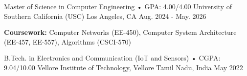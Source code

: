 
\begin{cventries}


\cventry
  {Master of Science in Computer Engineering • GPA: 4.00/4.00}%
  {University of Southern California (USC)}%
  {Los Angeles, CA }%
  {Aug. 2024 - May. 2026}%
  {%
    \begin{cvitems}%
      \item {\textbf{Coursework:} Computer Networks (EE-450), Computer System Architecture (EE-457, EE-557), Algorithms (CSCI-570)}%
    \end{cvitems}%
  }

\cventry
  {B.Tech. in Electronics and Communication (IoT and Sensors) • CGPA: 9.04/10.00}%
  {Vellore Institute of Technology, Vellore}%
  {Tamil Nadu, India}%
  {May 2022}%
  {%
  }

\end{cventries}
